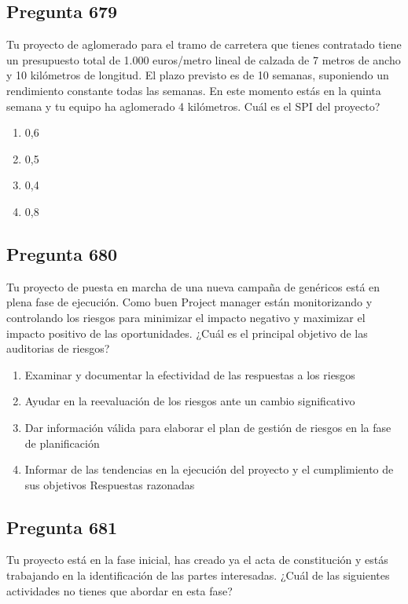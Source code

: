 \documentclass[11pt,a4paper]{article}
\begin{document}
\subsection*{Pregunta 679}
Tu proyecto de aglomerado para el tramo de carretera que tienes contratado tiene un presupuesto total de 1.000 euros/metro lineal de calzada de 7 metros de ancho y 10 kilómetros de longitud. El plazo previsto es de 10 semanas, suponiendo un rendimiento constante todas las semanas. En este momento estás en la quinta semana y tu equipo ha aglomerado 4 kilómetros. Cuál es el SPI del proyecto?

\begin{enumerate}[label=\alph*)]
  \item 0,6
  \item 0,5
  \item 0,4
  \item 0,8
\end{enumerate}

\subsection*{Pregunta 680}
Tu proyecto de puesta en marcha de una nueva campaña de genéricos está en plena fase de ejecución. Como buen Project manager están monitorizando y controlando los riesgos para minimizar el impacto negativo y maximizar el impacto positivo de las oportunidades. ¿Cuál es el principal objetivo de las auditorias de riesgos?

\begin{enumerate}[label=\alph*)]
  \item Examinar y documentar la efectividad de las respuestas a los riesgos
  \item Ayudar en la reevaluación de los riesgos ante un cambio significativo
  \item Dar información válida para elaborar el plan de gestión de riesgos en la fase de planificación
  \item Informar de las tendencias en la ejecución del proyecto y el cumplimiento de sus objetivos Respuestas razonadas
\end{enumerate}

\subsection*{Pregunta 681}
Tu proyecto está en la fase inicial, has creado ya el acta de constitución y estás trabajando en la identificación de las partes interesadas. ¿Cuál de las siguientes actividades no tienes que abordar en esta fase?
\end{document}
